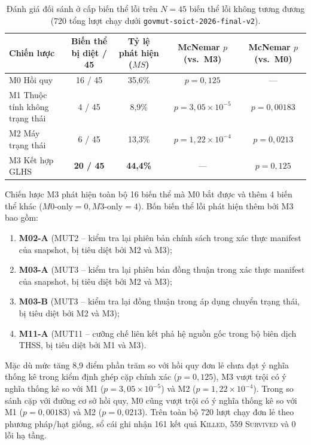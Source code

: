 \documentclass[11pt]{article}
\begin{document}
\begin{table}[t]
\caption{Đánh giá đối sánh ở cấp biến thể lỗi trên $N = 45$ biến thể lỗi không tương đương (720 tổng lượt chạy dưới \texttt{govmut-soict-2026-final-v2}).}
\label{tab:res}
\centering\small
\begin{tabularx}{\textwidth}{p{}c c c c}
\toprule
Chiến lược & Biến thể bị diệt / 45 & Tỷ lệ phát hiện ($MS$) & McNemar $p$ (vs.\ M3) & McNemar $p$ (vs.\ M0) \\
\midrule
M0 Hồi quy & 16 / 45 & 35,6\% & $p = 0{,}125$ & --- \\
M1 Thuộc tính không trạng thái & 4 / 45 & 8,9\% & $p = 3{,}05 \times 10^{-5}$ & $p = 0{,}00183$ \\
M2 Máy trạng thái & 6 / 45 & 13,3\% & $p = 1{,}22 \times 10^{-4}$ & $p = 0{,}0213$ \\
M3 Kết hợp GLHS & \textbf{20 / 45} & \textbf{44,4\%} & --- & $p = 0{,}125$ \\
\bottomrule
\end{tabularx}
\end{table}

Chiến lược M3 phát hiện toàn bộ 16 biến thể mà M0 bắt được và thêm 4 biến thể khác ($M0\text{-only} = 0, M3\text{-only} = 4$). Bốn biến thể lỗi phát hiện thêm bởi M3 bao gồm:
\begin{enumerate}
    \item \textbf{M02-A} (MUT2 -- kiểm tra lại phiên bản chính sách trong xác thực manifest của snapshot, bị tiêu diệt bởi M2 và M3);
    \item \textbf{M03-A} (MUT3 -- kiểm tra lại phiên bản đồng thuận trong xác thực manifest của snapshot, bị tiêu diệt bởi M2 và M3);
    \item \textbf{M03-B} (MUT3 -- kiểm tra lại đồng thuận trong áp dụng chuyển trạng thái, bị tiêu diệt bởi M2 và M3);
    \item \textbf{M11-A} (MUT11 -- cưỡng chế liên kết phả hệ nguồn gốc trong bộ biên dịch THSS, bị tiêu diệt bởi M1 và M3).
\end{enumerate}
Mặc dù mức tăng 8,9 điểm phần trăm so với hồi quy đơn lẻ chưa đạt ý nghĩa thống kê trong kiểm định ghép cặp chính xác ($p = 0{,}125$), M3 vượt trội có ý nghĩa thống kê so với M1 ($p = 3{,}05 \times 10^{-5}$) và M2 ($p = 1{,}22 \times 10^{-4}$). Trong so sánh cặp với đường cơ sở hồi quy, M0 cũng vượt trội có ý nghĩa thống kê so với M1 ($p = 0{,}00183$) và M2 ($p = 0{,}0213$). Trên toàn bộ 720 lượt chạy đơn lẻ theo phương pháp/hạt giống, sổ cái ghi nhận 161 kết quả \textsc{Killed}, 559 \textsc{Survived} và 0 lỗi hạ tầng.
\end{document}
